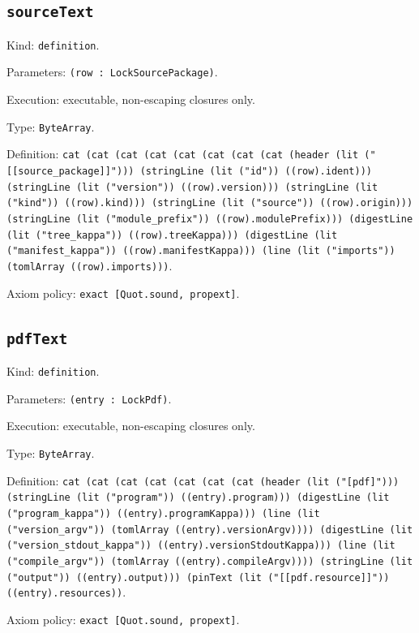 \documentclass[11pt]{article}
\begin{document}
\subsection*{\texttt{sourceText}}
\noindent Kind: \texttt{definition}.\par
\noindent Parameters: \texttt{(row : LockSourcePackage)}.\par
\noindent Execution: executable, non-escaping closures only.\par
\noindent Type: \texttt{ByteArray}.\par
\noindent Definition: \texttt{cat (cat (cat (cat (cat (cat (cat (cat (header (lit ("[[source\_package]]"))) (stringLine (lit ("id")) ((row).ident))) (stringLine (lit ("version")) ((row).version))) (stringLine (lit ("kind")) ((row).kind))) (stringLine (lit ("source")) ((row).origin))) (stringLine (lit ("module\_prefix")) ((row).modulePrefix))) (digestLine (lit ("tree\_kappa")) ((row).treeKappa))) (digestLine (lit ("manifest\_kappa")) ((row).manifestKappa))) (line (lit ("imports")) (tomlArray ((row).imports)))}.\par
\noindent Axiom policy: \texttt{exact [Quot.sound, propext]}.\par
\subsection*{\texttt{pdfText}}
\noindent Kind: \texttt{definition}.\par
\noindent Parameters: \texttt{(entry : LockPdf)}.\par
\noindent Execution: executable, non-escaping closures only.\par
\noindent Type: \texttt{ByteArray}.\par
\noindent Definition: \texttt{cat (cat (cat (cat (cat (cat (cat (header (lit ("[pdf]"))) (stringLine (lit ("program")) ((entry).program))) (digestLine (lit ("program\_kappa")) ((entry).programKappa))) (line (lit ("version\_argv")) (tomlArray ((entry).versionArgv)))) (digestLine (lit ("version\_stdout\_kappa")) ((entry).versionStdoutKappa))) (line (lit ("compile\_argv")) (tomlArray ((entry).compileArgv)))) (stringLine (lit ("output")) ((entry).output))) (pinText (lit ("[[pdf.resource]]")) ((entry).resources))}.\par
\noindent Axiom policy: \texttt{exact [Quot.sound, propext]}.\par
\end{document}
